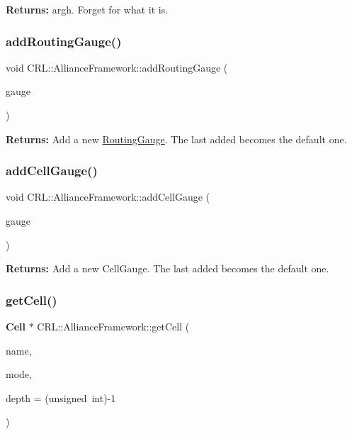 {\bfseries Returns\+:} argh. Forget for what it is. \mbox{\label{classCRL_1_1AllianceFramework_ae182fd150c695fd24c1b10ddbc377b32}} 
\subsubsection{\texorpdfstring{add\+Routing\+Gauge()}{addRoutingGauge()}}
{\footnotesize\ttfamily void C\+R\+L\+::\+Alliance\+Framework\+::add\+Routing\+Gauge (\begin{DoxyParamCaption}\item[{\mbox{\hyperlink{classCRL_1_1RoutingGauge}{Routing\+Gauge}} $\ast$}]{gauge }\end{DoxyParamCaption})}

{\bfseries Returns\+:} Add a new \mbox{\hyperlink{classCRL_1_1RoutingGauge}{Routing\+Gauge}}. The last added becomes the default one. \mbox{\label{classCRL_1_1AllianceFramework_aab16db33a0ce2e3bce5739f7cadb3d5a}} 
\subsubsection{\texorpdfstring{add\+Cell\+Gauge()}{addCellGauge()}}
{\footnotesize\ttfamily void C\+R\+L\+::\+Alliance\+Framework\+::add\+Cell\+Gauge (\begin{DoxyParamCaption}\item[{Cell\+Gauge $\ast$}]{gauge }\end{DoxyParamCaption})}

{\bfseries Returns\+:} Add a new Cell\+Gauge. The last added becomes the default one. \mbox{\label{classCRL_1_1AllianceFramework_a329d04c188668968308108523d16e2be}} 
\subsubsection{\texorpdfstring{get\+Cell()}{getCell()}}
{\footnotesize\ttfamily \textbf{ Cell} $\ast$ C\+R\+L\+::\+Alliance\+Framework\+::get\+Cell (\begin{DoxyParamCaption}\item[{const string \&}]{name,  }\item[{unsigned int}]{mode,  }\item[{unsigned int}]{depth = {\ttfamily (unsigned~int)-\/1} }\end{DoxyParamCaption})}


